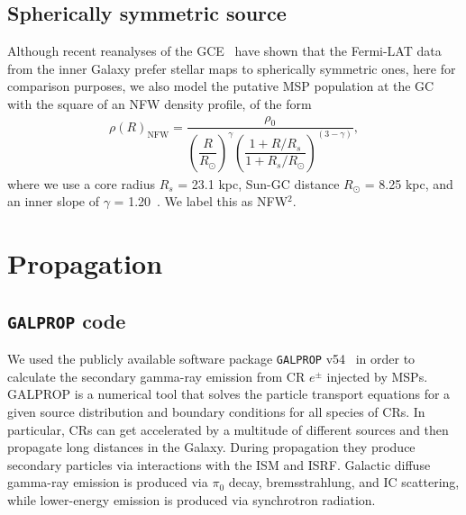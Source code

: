\documentclass[doublespace,nopageskip]{VTthesis} %
\begin{document}
\subsection{Spherically symmetric source}\label{sec:NFW}

Although recent reanalyses of the GCE~\cite{Macias:2016nev,Bartels:2017vsx} have shown that the Fermi-LAT data from the inner Galaxy prefer stellar maps to spherically symmetric ones, here for comparison purposes, we also model the putative MSP population at the GC with the square of an NFW density profile, of the form
\begin{eqnarray}\label{eq:NFW}
  \rho(R)_{\text{NFW}} = \dfrac{\rho_0}{\left(\dfrac{R}{R_\odot}\right)^\gamma\left(\dfrac{1+R/R_s}{1+R_s/R_\odot}\right)^{(3-\gamma)}},
\end{eqnarray}
where we use a core radius $R_s$ = 23.1 kpc, Sun-GC distance $R_\odot$ = 8.25 kpc, and an inner slope of $\gamma$ = 1.20~\cite{Abazajian:2012pn,Macias:2013vya}. We label this as NFW$^2$.

\section{Propagation}\label{sec:prop}

\subsection{\texttt{GALPROP} code}\label{sec:galprop}

We used the publicly available software package \texttt{GALPROP} v54~\cite{Galprop,Galpropsupplementary} in order to calculate the secondary gamma-ray emission from CR $e^\pm$ injected by MSPs. GALPROP is a numerical tool that solves the particle transport equations for a given source distribution and boundary conditions for all species of CRs. In particular, CRs can get accelerated by a multitude of different sources and then propagate long distances in the Galaxy. During propagation they produce secondary particles via interactions with the ISM and ISRF. Galactic diffuse gamma-ray emission is produced via $\pi_0$ decay, bremsstrahlung, and IC scattering, while lower-energy emission is produced via synchrotron radiation.
\end{document}
